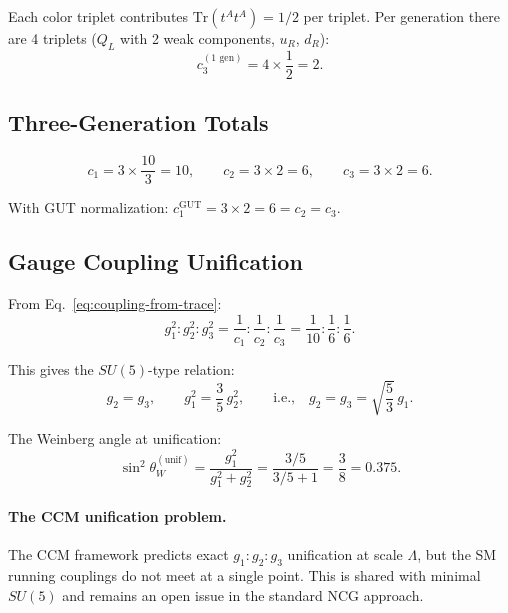 \documentclass[12pt,a4paper]{article}
\begin{document}
Each color triplet contributes $\mathrm{Tr}(t^A t^A) = 1/2$ per triplet.
Per generation there are 4 triplets ($Q_L$ with 2 weak components, $u_R$,
$d_R$):
\begin{equation}
c_3^{(\text{1 gen})} = 4 \times \frac{1}{2} = 2.
\end{equation}

\subsection{Three-Generation Totals}

\begin{equation}\label{eq:ccm-traces-final}
\boxed{
c_1 = 3 \times \frac{10}{3} = 10, \qquad
c_2 = 3 \times 2 = 6, \qquad
c_3 = 3 \times 2 = 6.
}
\end{equation}

With GUT normalization: $c_1^{\mathrm{GUT}} = 3 \times 2 = 6 = c_2 = c_3$.

\subsection{Gauge Coupling Unification}

From Eq.~\eqref{eq:coupling-from-trace}:
\begin{equation}
g_1^2 : g_2^2 : g_3^2 = \frac{1}{c_1} : \frac{1}{c_2} : \frac{1}{c_3}
= \frac{1}{10} : \frac{1}{6} : \frac{1}{6}.
\end{equation}

This gives the $SU(5)$-type relation:
\begin{equation}\label{eq:su5-relation}
\boxed{g_2 = g_3, \qquad g_1^2 = \frac{3}{5}\,g_2^2,
\qquad\text{i.e.,}\quad g_2 = g_3 = \sqrt{\frac{5}{3}}\,g_1.}
\end{equation}

The Weinberg angle at unification:
\begin{equation}
\sin^2\theta_W^{(\mathrm{unif})} = \frac{g_1^2}{g_1^2 + g_2^2}
= \frac{3/5}{3/5 + 1} = \frac{3}{8} = 0.375.
\end{equation}

\paragraph{The CCM unification problem.}
The CCM framework predicts exact $g_1 : g_2 : g_3$ unification at scale
$\Lambda$, but the SM running couplings do not meet at a single point.
This is shared with minimal $SU(5)$ and remains an open issue in the
standard NCG approach.
\end{document}
